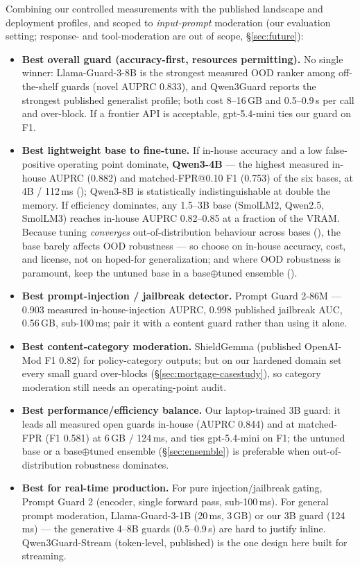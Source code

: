 Combining our controlled measurements with the published landscape and deployment profiles, and scoped to \emph{input-prompt} moderation (our evaluation setting; response- and tool-moderation are out of scope, \S\ref{sec:future}):

\begin{itemize}
  \item \textbf{Best overall guard (accuracy-first, resources permitting).} No single winner: Llama-Guard-3-8B is the strongest measured OOD ranker among off-the-shelf guards (novel AUPRC 0.833), and Qwen3Guard reports the strongest published generalist profile; both cost 8--16\,GB and 0.5--0.9\,s per call and over-block. If a frontier API is acceptable, gpt-5.4-mini ties our guard on F1.
  \item \textbf{Best lightweight base to fine-tune.} If in-house accuracy and a low false-positive operating point dominate, \textbf{Qwen3-4B} --- the highest measured in-house AUPRC (0.882) and matched-FPR@0.10 F1 (0.753) of the six bases, at 4B / 112\,ms (); Qwen3-8B is statistically indistinguishable at double the memory. If efficiency dominates, any 1.5--3B base (SmolLM2, Qwen2.5, SmolLM3) reaches in-house AUPRC 0.82--0.85 at a fraction of the VRAM. Because tuning \emph{converges} out-of-distribution behaviour across bases (), the base barely affects OOD robustness --- so choose on in-house accuracy, cost, and license, not on hoped-for generalization; and where OOD robustness is paramount, keep the untuned base in a base$\oplus$tuned ensemble ().
  \item \textbf{Best prompt-injection / jailbreak detector.} Prompt Guard 2-86M --- 0.903 measured in-house-injection AUPRC, 0.998 published jailbreak AUC, 0.56\,GB, sub-100\,ms; pair it with a content guard rather than using it alone.
  \item \textbf{Best content-category moderation.} ShieldGemma (published OpenAI-Mod F1 0.82) for policy-category outputs; but on our hardened domain set every small guard over-blocks (\S\ref{sec:mortgage-casestudy}), so category moderation still needs an operating-point audit.
  \item \textbf{Best performance/efficiency balance.} Our laptop-trained 3B guard: it leads all measured open guards in-house (AUPRC 0.844) and at matched-FPR (F1 0.581) at 6\,GB / 124\,ms, and ties gpt-5.4-mini on F1; the untuned base or a base$\oplus$tuned ensemble (\S\ref{sec:ensemble}) is preferable when out-of-distribution robustness dominates.
  \item \textbf{Best for real-time production.} For pure injection/jailbreak gating, Prompt Guard 2 (encoder, single forward pass, sub-100\,ms). For general prompt moderation, Llama-Guard-3-1B (20\,ms, 3\,GB) or our 3B guard (124\,ms) --- the generative 4--8B guards (0.5--0.9\,s) are hard to justify inline. Qwen3Guard-Stream (token-level, published) is the one design here built for streaming.
\end{itemize}
